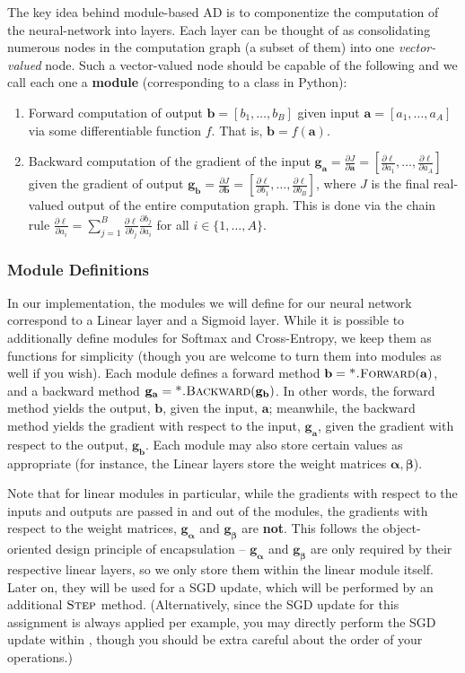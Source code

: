 \documentclass[11pt,addpoints,answers]{exam}
\newcommand{\adj}[1]{\frac{\partial \ell}{\partial #1}}
\newcommand{\av}{\mathbf{a}}
\newcommand{\bv}{\mathbf{b}}
\newcommand{\gv}{\mathbf{g}}
\newcommand{\alphav     }{\boldsymbol \alpha     }
\newcommand{\betav      }{\boldsymbol \beta      }
\begin{document}
The key idea behind module-based AD is to componentize the computation of the neural-network into layers. Each layer can be thought of as consolidating numerous nodes in the computation graph (a subset of them) into one \emph{vector-valued} node. Such a vector-valued node should be capable of the following and we call each one a {\bf module} (corresponding to a class in Python):
\begin{enumerate}
    \item Forward computation of output $\bv = [b_1, \ldots, b_B]$ given input $\av = [a_1, \ldots, a_A]$ via some differentiable function $f$. That is, $\bv = f(\av)$. 
    \item Backward computation of the gradient of the input $\gv_{\av} = \frac{\partial J}{\partial \av} = [\adj{a_1}, \ldots, \adj{a_A}]$ given the gradient of output $\gv_{\bv} = \frac{\partial J}{\partial \bv} = [\adj{b_1}, \ldots, \adj{b_B}]$, where $J$ is the final real-valued output of the entire computation graph. This is done via the chain rule $\adj{a_i} = \sum_{j=1}^B \adj{b_j} \frac{\partial  b_j}{\partial  a_i}$ for all $i \in \{1, \ldots, A\}$.
\end{enumerate}

\subsubsection{Module Definitions}

In our implementation, the modules we will define for our neural network correspond to a Linear layer and a Sigmoid layer. While it is possible to additionally define modules for Softmax and Cross-Entropy, we keep them as functions for simplicity (though you are welcome to turn them into modules as well if you wish). Each module defines a forward method $\bv = \textproc{*.Forward}(\av)$, and a backward method $\gv_{\av} = \textproc{*.Backward}(\gv_{\bv})$. In other words, the forward method yields the output, $\bv$, given the input, $\av$; meanwhile, the backward method yields the gradient with respect to the input, $\gv_{\av}$, given the gradient with respect to the output, $\gv_{\bv}$. Each module may also store certain values as appropriate (for instance, the Linear layers store the weight matrices $\alphav, \betav$).

Note that for linear modules in particular, while the gradients with respect to the inputs and outputs are passed in and out of the modules, the gradients with respect to the weight matrices, $\gv_{\alphav}$ and $\gv_{\betav}$ are \textbf{not}. This follows the object-oriented design principle of encapsulation -- $\gv_{\alphav}$ and $\gv_{\betav}$ are only required by their respective linear layers, so we only store them within the linear module itself. Later on, they will be used for a SGD update, which will be performed by an additional $\textproc{Step}$ method. (Alternatively, since the SGD update for this assignment is always applied per example, you may directly perform the SGD update within , though you should be extra careful about the order of your operations.)
\end{document}
